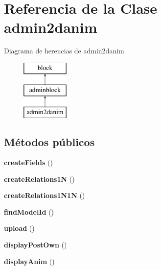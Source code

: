 \hypertarget{classadmin2danim}{}\section{Referencia de la Clase admin2danim}
\label{classadmin2danim}
Diagrama de herencias de admin2danim\begin{figure}[H]
\begin{center}
\leavevmode
\includegraphics[height=3.000000cm]{classadmin2danim}
\end{center}
\end{figure}
\subsection*{Métodos públicos}
\begin{DoxyCompactItemize}
\item 
\mbox{\label{classadmin2danim_a236816c06411884f994a70c97c8f3a71}} 
{\bfseries create\+Fields} ()
\item 
\mbox{\label{classadmin2danim_a3abf1a2202ba64cd5148c8ce93aa60b3}} 
{\bfseries create\+Relations1N} ()
\item 
\mbox{\label{classadmin2danim_aed4665b024fe1b09404d2ad47444f4cf}} 
{\bfseries create\+Relations1\+N1N} ()
\item 
\mbox{\label{classadmin2danim_af8b70fda0c451907be1ddabaf757cd92}} 
{\bfseries find\+Model\+Id} ()
\item 
\mbox{\label{classadmin2danim_a047496fc7a4c63d403f2a9aeba9bb0cc}} 
{\bfseries upload} ()
\item 
\mbox{\label{classadmin2danim_a950abe5065035087fa8e9c7478a90482}} 
{\bfseries display\+Post\+Own} ()
\item 
\mbox{\label{classadmin2danim_a04b458e682b3a76d062bc3b686fe4a08}} 
{\bfseries display\+Anim} ()
\end{DoxyCompactItemize}
